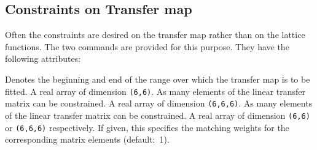 \subsection{Constraints on Transfer map}
\label{S-RMAT}
Often the constraints are desired on the transfer map
rather than on the lattice functions.
The two commands
are provided for this purpose.
They have the following attributes:
\begin{mylist}
Denotes the beginning and end of the range over which the transfer
map is to be fitted.
A real array of dimension {\tt (6,6)}.
As many elements of the linear transfer matrix can be constrained.
A real array of dimension {\tt (6,6,6)}.
As many elements of the linear transfer matrix can be constrained.
A real array of dimension {\tt (6,6)} or {\tt (6,6,6)} respectively.
If given, this specifies the matching weights for the corresponding
matrix elements (default:~1).
\end{mylist}
